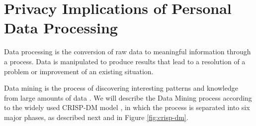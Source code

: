 
\section{Privacy Implications of Personal Data Processing} 
\label{sec:PrivacyImplicationsPersonalDataProcessing}


Data processing is the conversion of raw data to meaningful information through a process. Data is manipulated to produce results that lead to a resolution of a problem or improvement of an existing situation. 

Data mining is the process of discovering interesting patterns and knowledge from large amounts of data \cite{han2011data}. We will describe the Data Mining process according to the widely used CRISP-DM model \cite{wirth2000crisp}, in which the process is separated into six major phases, as described next and in Figure \ref{fig:crisp-dm}.

